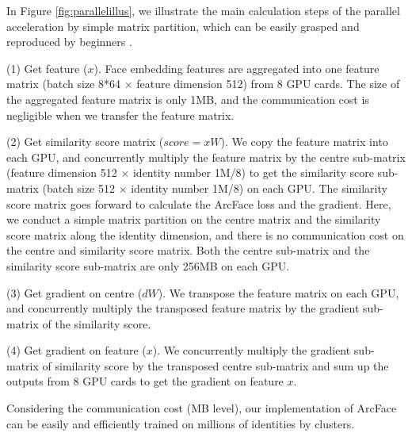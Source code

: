 \documentclass[10pt,twocolumn,letterpaper]{article}
\begin{document}
In Figure \ref{fig:parallelillus}, we illustrate the main calculation steps of the parallel acceleration by simple matrix partition, which can be easily grasped and reproduced by beginners \cite{c231n}.

(1) Get feature ($x$). Face embedding features are aggregated into one feature matrix (batch size 8*64 $\times$ feature dimension 512) from 8 GPU cards. The size of the aggregated feature matrix is only 1MB, and the communication cost is negligible when we transfer the feature matrix. 

(2) Get similarity score matrix ($score=xW$). We copy the feature matrix into each GPU, and concurrently multiply the feature matrix by the centre sub-matrix (feature dimension 512 $\times$ identity number 1M/8) to get the similarity score sub-matrix (batch size 512 $\times$ identity number 1M/8) on each GPU. The similarity score matrix goes forward to calculate the ArcFace loss and the gradient. Here, we conduct a simple matrix partition on the centre matrix and the similarity score matrix along the identity dimension, and there is no communication cost on the centre and similarity score matrix. Both the centre sub-matrix and the similarity score sub-matrix are only 256MB on each GPU. 

(3) Get gradient on centre ($dW$). We transpose the feature matrix on each GPU, and concurrently multiply the transposed feature matrix by the gradient sub-matrix of the similarity score. 

(4) Get gradient on feature ($x$). We concurrently multiply the gradient sub-matrix of similarity score by the transposed centre sub-matrix and sum up the outputs from 8 GPU cards to get the gradient on feature $x$. 

Considering the communication cost (MB level), our implementation of ArcFace can be easily and efficiently trained on millions of identities by clusters.
\end{document}
